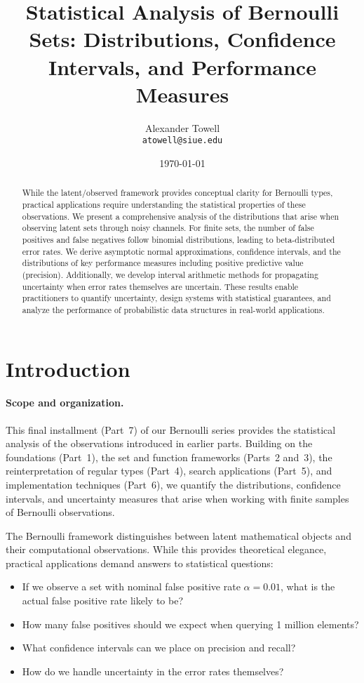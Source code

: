 \documentclass[11pt,final,hidelinks]{article}
\title{Statistical Analysis of Bernoulli Sets: Distributions, Confidence Intervals, and Performance Measures}
\author{
    Alexander Towell\\
    \texttt{atowell@siue.edu}
}
\date{\today}
\newcommand{\fprate}{\alpha}
\begin{document}
\maketitle

\begin{abstract}
While the latent/observed framework provides conceptual clarity for Bernoulli types, practical applications require understanding the statistical properties of these observations. We present a comprehensive analysis of the distributions that arise when observing latent sets through noisy channels. For finite sets, the number of false positives and false negatives follow binomial distributions, leading to beta-distributed error rates. We derive asymptotic normal approximations, confidence intervals, and the distributions of key performance measures including positive predictive value (precision). Additionally, we develop interval arithmetic methods for propagating uncertainty when error rates themselves are uncertain. These results enable practitioners to quantify uncertainty, design systems with statistical guarantees, and analyze the performance of probabilistic data structures in real-world applications.
\end{abstract}

\section{Introduction}

\paragraph{Scope and organization.}  This final installment (Part~7) of our Bernoulli series provides the statistical analysis of the observations introduced in earlier parts.  Building on the foundations (Part~1), the set and function frameworks (Parts~2 and~3), the reinterpretation of regular types (Part~4), search applications (Part~5), and implementation techniques (Part~6), we quantify the distributions, confidence intervals, and uncertainty measures that arise when working with finite samples of Bernoulli observations.

The Bernoulli framework distinguishes between latent mathematical objects and their computational observations. While this provides theoretical elegance, practical applications demand answers to statistical questions:
\begin{itemize}
    \item If we observe a set with nominal false positive rate $\fprate = 0.01$, what is the actual false positive rate likely to be?
    \item How many false positives should we expect when querying 1 million elements?
    \item What confidence intervals can we place on precision and recall?
    \item How do we handle uncertainty in the error rates themselves?
\end{itemize}
\end{document}
